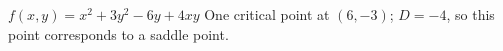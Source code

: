 {$f(x,y) = x^2+3y^2-6y+4xy$
}
{
One critical point at $(6,-3)$; $D = -4$, so this point corresponds to a saddle point.
}
